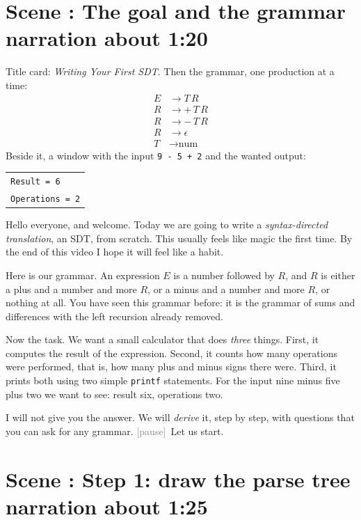 \documentclass[11pt,a4paper]{article}
\newcommand{\pause}{\textcolor{gray}{\textsf{[pause]}}}
\newcounter{scene}
\newcommand{\scene}[2]{\stepcounter{scene}\needspace{20\baselineskip}\section*{Scene \thescene: #1 \hfill {\normalfont\small #2}}}
\begin{document}
\scene{The goal and the grammar}{narration about 1:20}

\begin{onscreen}
Title card: \emph{Writing Your First SDT}. Then the grammar, one production at a time:
\[
\begin{aligned}
E &\to T\,R \\
R &\to +\,T\,R \\
R &\to -\,T\,R \\
R &\to \epsilon \\
T &\to \text{num}
\end{aligned}
\]
Beside it, a window with the input \texttt{9 - 5 + 2} and the wanted output:
\begin{center}
\begin{tabular}{|l|}
\hline
\texttt{Result     = 6}\\
\texttt{Operations = 2}\\ \hline
\end{tabular}
\end{center}
\end{onscreen}

\begin{narration}
Hello everyone, and welcome. Today we are going to write a \emph{syntax-directed translation}, an SDT, from scratch. This usually feels like magic the first time. By the end of this video I hope it will feel like a habit.

Here is our grammar. An expression $E$ is a number followed by $R$, and $R$ is either a plus and a number and more $R$, or a minus and a number and more $R$, or nothing at all. You have seen this grammar before: it is the grammar of sums and differences with the left recursion already removed.

Now the task. We want a small calculator that does \emph{three} things. First, it computes the result of the expression. Second, it counts how many operations were performed, that is, how many plus and minus signs there were. Third, it prints both using two simple \texttt{printf} statements. For the input nine minus five plus two we want to see: result six, operations two.

I will not give you the answer. We will \emph{derive} it, step by step, with questions that you can ask for any grammar. \pause\ Let us start.
\end{narration}

\scene{Step 1: draw the parse tree}{narration about 1:25}
\end{document}
